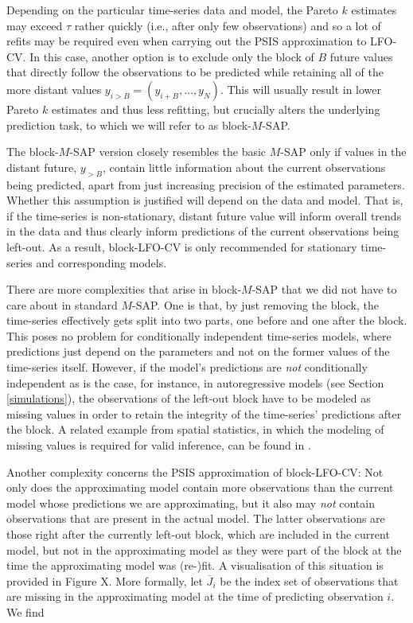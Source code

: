 \documentclass[american,]{article}
\begin{document}
Depending on the particular time-series data and model, the Pareto \(k\) estimates
may exceed \(\tau\) rather quickly (i.e., after only few observations) and so
a lot of refits may be required even when carrying out the PSIS approximation
to LFO-CV. In this case, another option is to exclude only the block of \(B\)
future values that directly follow the observations to be predicted while
retaining all of the more distant values \(y_{i>B} = (y_{i + B}, \ldots, y_N)\).
This will usually result in lower Pareto \(k\) estimates and thus less refitting,
but crucially alters the underlying prediction task, to which we will refer
to as block-\(M\)-SAP.

The block-\(M\)-SAP version closely resembles the basic \(M\)-SAP only if values in
the distant future, \(y_{>B}\), contain little information about the current
observations being predicted, apart from just increasing precision of the
estimated parameters. Whether this assumption is justified will depend
on the data and model. That is, if the time-series is non-stationary, distant
future value will inform overall trends in the data and thus clearly inform
predictions of the current observations being left-out. As a result,
block-LFO-CV is only recommended for stationary time-series and corresponding
models.

There are more complexities that arise in block-\(M\)-SAP that we did not have to
care about in standard \(M\)-SAP. One is that, by just removing the block, the
time-series effectively gets split into two parts, one before and one after the
block. This poses no problem for conditionally independent time-series models,
where predictions just depend on the parameters and not on the former values of
the time-series itself. However, if the model's predictions are \emph{not}
conditionally independent as is the case, for instance, in autoregressive models
(see Section \ref{simulations}), the observations of the left-out block have to
be modeled as missing values in order to retain the integrity of the
time-series' predictions after the block. A related example from spatial
statistics, in which the modeling of missing values is required for valid
inference, can be found in \citet{buerkner:non-factorizable}.

Another complexity concerns the PSIS approximation of block-LFO-CV: Not only
does the approximating model contain more observations than the current model
whose predictions we are approximating, but it also may \emph{not} contain
observations that are present in the actual model. The latter observations are
those right after the currently left-out block, which are included in the
current model, but not in the approximating model as they were part of the block
at the time the approximating model was (re-)fit. A visualisation of this
situation is provided in Figure X. More formally, let \(\overline{J}_i\) be the
index set of observations that are missing in the approximating model at the
time of predicting observation \(i\). We find
\end{document}
